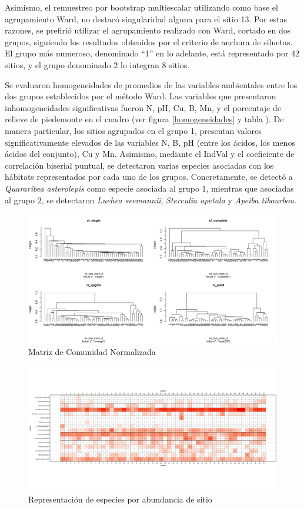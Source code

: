 \documentclass[11pt,]{article}
\begin{document}
Asimismo, el remuestreo por bootstrap multiescalar utilizando como base
el agrupamiento Ward, no destacó singularidad alguna para el sitio 13.
Por estas razones, se prefirió utilizar el agrupamiento realizado con
Ward, cortado en dos grupos, siguiendo los resultados obtenidos por el
criterio de anchura de siluetas. El grupo más numeroso, denominado ``1''
en lo adelante, está representado por 42 sitios, y el grupo denominado 2
lo integran 8 sitios.

Se evaluaron homogeneidades de promedios de las variables ambientales
entre los dos grupos establecidos por el método Ward. Las variables que
presentaron inhomogeneidades significativas fueron N, pH, Cu, B, Mn, y
el porcentaje de relieve de piedemonte en el cuadro (ver figura
\ref{homogeneidades} y tabla \label{promedio}). De manera particular,
los sitios agrupados en el grupo 1, presentan valores significativamente
elevados de las variables N, B, pH (entre los ácidos, los menos ácidos
del conjunto), Cu y Mn. Asimismo, mediante el IndVal y el coeficiente de
correlación biserial puntual, se detectaron varias especies asociadas
con los hábitats representados por cada uno de los grupos.
Concretamente, se detectó a \emph{Quararibea asterolepis} como especie
asociada al grupo 1, mientras que asociadas al grupo 2, se detectaron
\emph{Luehea seemannii}, \emph{Sterculia apetala} y \emph{Apeiba
tibourbou}.

\begin{figure}
\centering
\includegraphics[width=1.10000\textwidth]{Rplot_diferentes_metodos.png}
\caption{Matriz de Comunidad Normalizada\label{agrupado}}
\end{figure}

\begin{figure}
\centering
\includegraphics[width=1.10000\textwidth]{Rplot_sitios_especies.png}
\caption{Representación de especies por abundancia de
sitio\label{abundancia}}
\end{figure}
\end{document}
